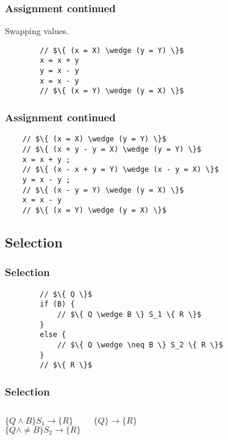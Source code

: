 \begin{frame}[fragile]
    \frametitle{Assignment continued}
    Swapping values.
    \begin{verbatim}
        // $\{ (x = X) \wedge (y = Y) \}$
        x = x + y
        y = x - y
        x = x - y
        // $\{ (x = Y) \wedge (y = X) \}$
    \end{verbatim}
\end{frame}

\begin{frame}[fragile]
    \frametitle{Assignment continued}
    \begin{verbatim}
    // $\{ (x = X) \wedge (y = Y) \}$
    // $\{ (x + y - y = X) \wedge (y = Y) \}$
    x = x + y ;
    // $\{ (x - x + y = Y) \wedge (x - y = X) \}$
    y = x - y ;
    // $\{ (x - y = Y) \wedge (y = X) \}$
    x = x - y
    // $\{ (x = Y) \wedge (y = X) \}$
    \end{verbatim}
\end{frame}

\subsection{Selection}

\begin{frame}[fragile]
    \frametitle{Selection}
    \begin{verbatim}
        // $\{ Q \}$
        if (B) {
            // $\{ Q \wedge B \} S_1 \{ R \}$
        }
        else {
            // $\{ Q \wedge \neq B \} S_2 \{ R \}$
        }
        // $\{ R \}$
    \end{verbatim}
\end{frame}

\begin{frame}[fragile]
    \frametitle{Selection}
    \begin{columns}[c]
        $\{ Q \wedge B \} S_1 \to \{ R \}$ \\
        $\{ Q \wedge \neq B \} S_2 \to \{ R \}$

        $\{ Q \} \to \{ R \}$
    \end{columns}
\end{frame}


